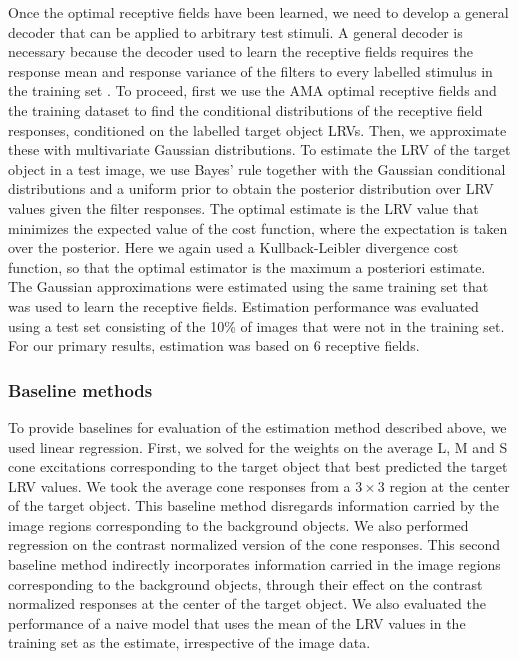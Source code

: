 \documentclass{jov}
\begin{document}
Once the optimal receptive fields have been learned, we need to develop a general decoder that can be applied to arbitrary test stimuli.
A general decoder is necessary because the decoder used to learn the receptive fields requires the response mean and response variance of the filters to every labelled stimulus in the training set \cite{geisler2009optimal,burge2017accuracy}.
To proceed, first we use the AMA optimal receptive fields and the training dataset to find the conditional distributions of the receptive field responses, conditioned on the labelled target object LRVs.
Then, we approximate these with multivariate Gaussian distributions.
To estimate the LRV of the target object in a test image, we use Bayes' rule together with the Gaussian conditional distributions and a uniform prior to obtain the posterior distribution over LRV values given the filter responses.
The optimal estimate is the LRV value that minimizes the expected value of the cost function, where the expectation is taken over the posterior.
Here we again used a Kullback-Leibler divergence cost function, so that the optimal estimator is the maximum a posteriori estimate.
The Gaussian approximations were estimated using the same training set that was used to learn the receptive fields.
Estimation performance was evaluated using a test set consisting of the 10\% of images that were not in the training set.
For our primary results, estimation was based on 6 receptive fields.

\subsubsection*{Baseline methods}

To provide baselines for evaluation of the estimation method described above, we used linear regression.
First, we solved for the weights on the average L, M and S cone excitations corresponding to the target object that best predicted the target LRV values.
We took the average cone responses from a $3 \times 3$ region at the center of the target object.
This baseline method disregards information carried by the image regions corresponding to the background objects.
We also performed regression on the contrast normalized version of the cone responses.
This second baseline method indirectly incorporates information carried in the image regions corresponding to the background objects,
through their effect on the contrast normalized responses at the center of the target object. 
We also evaluated the performance of a naive model that uses the mean of the LRV values in the training set as the estimate, irrespective
of the image data.
\end{document}

